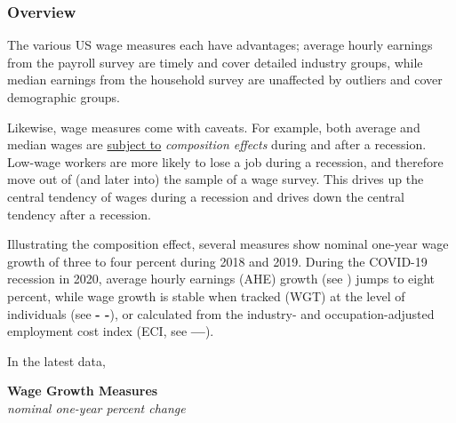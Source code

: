 \documentclass{report}
\begin{document}
{\begin{minipage}{0.76\textwidth}
\subsubsection*{Overview}
\vspace*{-1mm}

\small The various US wage measures each have advantages; average hourly earnings from the payroll survey are timely and cover detailed industry groups, while median earnings from the household survey are unaffected by outliers and cover demographic groups. 

Likewise, wage measures come with caveats. For example, both average and median wages are \href{https://www.dallasfed.org/research/economics/2022/0215}{subject to} \textit{composition effects} during and after a recession. Low-wage workers are more likely to lose a job during a recession, and therefore move out of (and later into) the sample of a wage survey. This drives up the central tendency of wages during a recession and drives down the central tendency after a recession. 
\end{minipage}

\begin{minipage}{0.385\textwidth}
\small Illustrating the composition effect, several measures show nominal one-year wage growth of three to four percent during 2018 and 2019. During the COVID-19 recession in 2020, average hourly earnings (AHE) growth (see \color{magenta}{---}\color{black}) jumps to eight percent, while wage growth is stable when tracked (WGT) at the level of individuals (see \color{blue}\textbf{- -}\color{black}), or calculated from the industry- and occupation-adjusted employment cost index (ECI, see \color{violet}\textbf{---}\color{black}).

In the latest data, 
\end{minipage} \hspace{4mm} \begin{minipage}{0.335\textwidth}
\normalsize \textbf{Wage Growth Measures}\\
\footnotesize{\textit{nominal one-year percent change}}
\vspace{3.3cm}


\end{minipage}}
\end{document}
